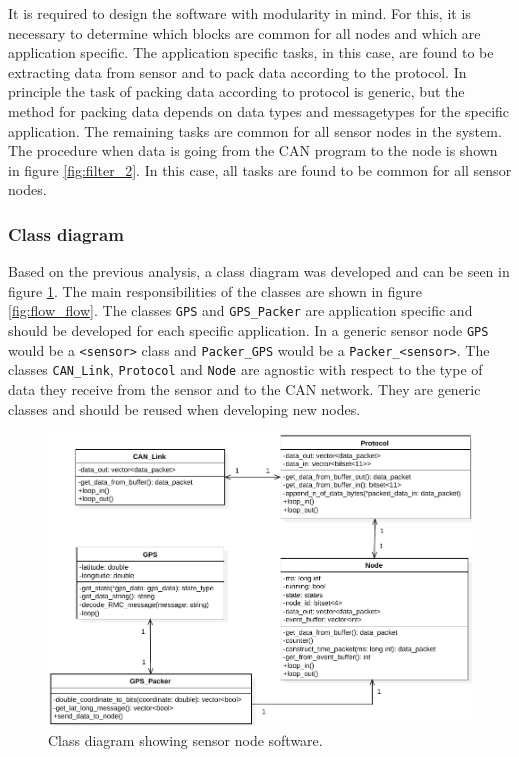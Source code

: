 It is required to design the software with modularity in mind.
For this, it is necessary to determine which blocks are common for all nodes and which are application specific.
The application specific tasks, in this case, are found to be extracting data from sensor and to pack data according to the protocol.
In principle the task of packing data according to protocol is generic, but the method for packing data depends on data types and messagetypes for the specific application.
The remaining tasks are common for all sensor nodes in the system. 
The procedure when data is going from the CAN program to the node is shown in figure \ref{fig:filter_2}.
In this case, all tasks are found to be common for all sensor nodes.

\subsubsection*{Class diagram}
Based on the previous analysis, a class diagram was developed and can be seen in figure \ref{fig:node_class_diagram}.
The main responsibilities of the classes are shown in figure \ref{fig:flow_flow}.
The classes \texttt{GPS} and \texttt{GPS\_Packer} are application specific and should be developed for each specific application.
In a generic sensor node \texttt{GPS} would be a \texttt{<sensor>} class and \texttt{Packer\_GPS}  would be a \texttt{Packer\_<sensor>}. 
The classes \texttt{CAN\_Link}, \texttt{Protocol} and \texttt{Node} are agnostic with respect to the type of data they receive from the sensor and to the CAN network.
They are generic classes and should be reused when developing new nodes.

\begin{figure}[!h]
\centering
\includegraphics[width=1\textwidth]{graphics/ClassDiagram_NodeSimple}
\caption{Class diagram showing sensor node software.}
\label{fig:node_class_diagram}
\end{figure}

